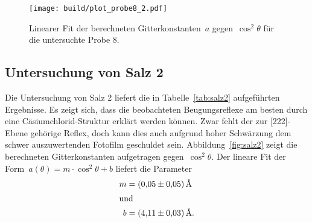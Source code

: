 \begin{figure}[htb]
  \centering
  \texttt{[image: build/plot\_probe8\_2.pdf]}
  \caption{Linearer Fit der berechneten Gitterkonstanten~$a$
  gegen~$\cos^2\theta$ für die untersuchte Probe 8.}
  \label{fig:probe8}
\end{figure}

\subsection{Untersuchung von Salz 2}

Die Untersuchung von Salz 2 liefert die in Tabelle~\ref{tab:salz2}
aufgeführten Ergebnisse. Es zeigt sich, dass die beobachteten Beugungsreflexe
am besten durch eine Cäsiumchlorid-Struktur erklärt werden können. Zwar fehlt
der zur [222]-Ebene gehörige Reflex, doch kann dies auch aufgrund hoher
Schwärzung dem schwer auszuwertenden Fotofilm geschuldet sein.
Abbildung~\ref{fig:salz2} zeigt die berechneten Gitterkonstanten aufgetragen
gegen~$\cos^2{\theta}$. Der lineare Fit der
Form~$a(\theta)=m\cdot\cos^2{\theta}+b$ liefert die Parameter
%
\begin{align}
  m&=\SI{0.05(5)}{\angstrom} \\
  \shortintertext{und}
  b&=\SI{4.11(3)}{\angstrom}. %
\end{align}

